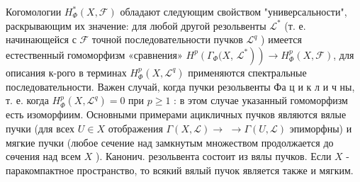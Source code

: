 \documentclass[10pt]{article}
\begin{document}
Когомологии $H_{\Phi}^{*}(X, \mathscr{F})$ обладают следующим свойством "универсальности", раскрывающим их значение: для любой другой резольвенты $\mathscr{L}^{*}$ (т. е. начинающейся с $\mathscr{F}$ точной последовательности пучков $\mathscr{L}^{q}$ ) имеется естественный гомоморфизм «сравнения» $H^{p}\left(\Gamma_{\Phi}(X\right.$, $\left.\left.\mathscr{L}^{*}\right)\right) \rightarrow H_{\Phi}^{p}(X, \mathscr{F})$, для описания к-рого в терминах $H_{\Phi}^{p}\left(X, \mathscr{L}^{q}\right)$ применяются спектральные последовательности. Важен случай, когда пучки резольвенты Фа ц и к л и ч ны, т. е. когда $H_{\Phi}^{p}\left(X, \mathscr{L}^{q}\right)=0$ при $p \geqslant 1$ : в этом случае указанный гомоморфизм есть изоморфиим. Основными примерами ацикличных пучков являются вялые пучки (для всех $U \in X$ отображения $\Gamma(X, \mathscr{L}) \rightarrow$ $\rightarrow \Gamma(U, \mathscr{L})$ эпиморфны) и мягкие пучки (любое сечение над замкнутым множеством продолжается до сөчения над всем $X$ ). Канонич. резольвента состоит из вялы пучков. Если $X$ - паракомпактное пространство, то всякий вялый пучок является также и мягким.
\end{document}
